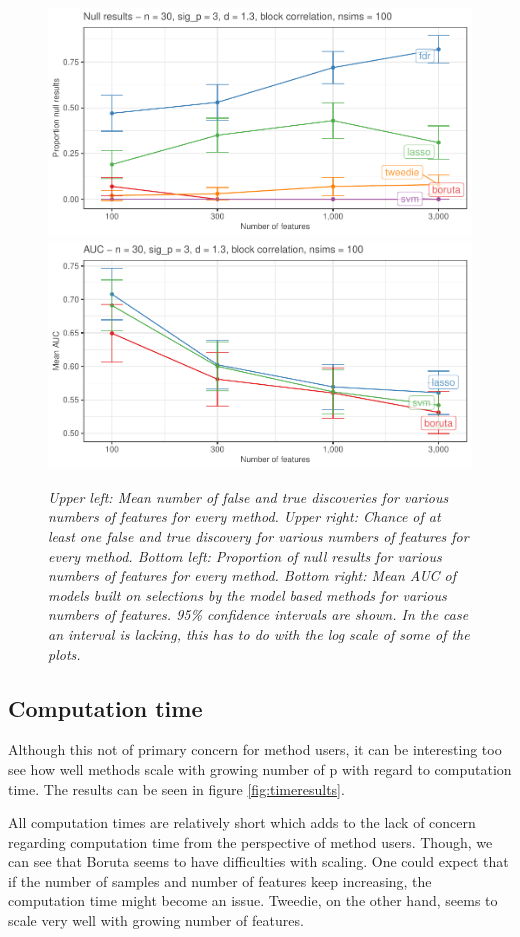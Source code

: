 \documentclass[
]{article}
\begin{document}
\begin{figure}

{\centering \includegraphics[width=0.49\linewidth]{main_files/figure-latex/blockC2-1} \includegraphics[width=0.49\linewidth]{main_files/figure-latex/blockC2-2} 

}

\caption{\textit{Upper left: Mean number of false and true discoveries for various numbers of features for every method. Upper right: Chance of at least one false and true discovery for various numbers of features for every method. Bottom left: Proportion of null results for various numbers of features for every method. Bottom right: Mean AUC of models built on selections by the model based methods for various numbers of features. 95\% confidence intervals are shown. In the case an interval is lacking, this has to do with the log scale of some of the plots.}}\label{fig:blockC2}
\end{figure}

\hypertarget{computation-time}{%
\subsection{Computation time}\label{computation-time}}

Although this not of primary concern for method users, it can be interesting too see how well methods scale with growing number of p with regard to computation time. The results can be seen in figure \ref{fig:timeresults}.

All computation times are relatively short which adds to the lack of concern regarding computation time from the perspective of method users. Though, we can see that Boruta seems to have difficulties with scaling. One could expect that if the number of samples and number of features keep increasing, the computation time might become an issue. Tweedie, on the other hand, seems to scale very well with growing number of features.
\end{document}

